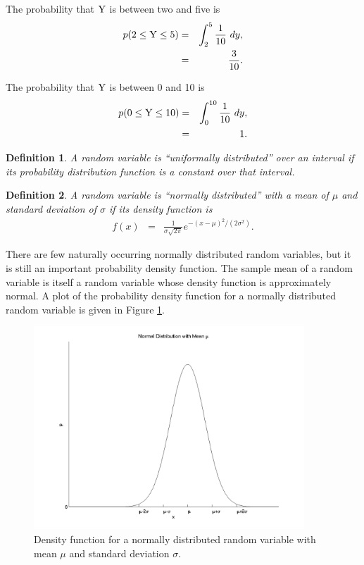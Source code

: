 \documentclass[12pt]{article}
\newtheorem{definition}{Definition}[section]
\begin{document}
The probability that ${\rm Y}$ is between two and five is 
\begin{eqnarray*}
  p( 2 \leq {\rm Y} \leq 5) & = & \int^5_2 \frac{1}{10} ~ dy, \\
  & = & \frac{3}{10}.
\end{eqnarray*}

The probability that ${\rm Y}$ is between 0 and 10 is 
\begin{eqnarray*}
  p( 0 \leq {\rm Y} \leq 10) & = & \int^{10}_0 \frac{1}{10} ~ dy, \\
  & = & 1.
\end{eqnarray*}

\begin{definition}
  A random variable is ``uniformally distributed'' over an interval if
  its probability distribution function is a constant over that
  interval.
\end{definition}

\begin{definition}
  A random variable is ``normally distributed'' with a mean of $\mu$
  and standard deviation of $\sigma$ if its density function is 
  \begin{eqnarray*}
    f(x) & = & \frac{1}{\sigma\sqrt{2\pi}} e^{-(x-\mu)^2/(2\sigma^2)}.
  \end{eqnarray*}
\end{definition}

There are few naturally occurring normally distributed random
variables, but it is still an important probability density function.
The sample mean of a random variable is itself a random variable whose
density function is approximately normal. A plot of the probability
density function for a normally distributed random variable is given
in Figure \ref{fig:normalDist}.


\begin{figure}[tb]
  \centerline{\includegraphics[height=3in]{normal}}
  \caption{Density function for a normally distributed random variable
    with mean $\mu$ and standard deviation $\sigma$.}
  \label{fig:normalDist}
\end{figure}
\end{document}
